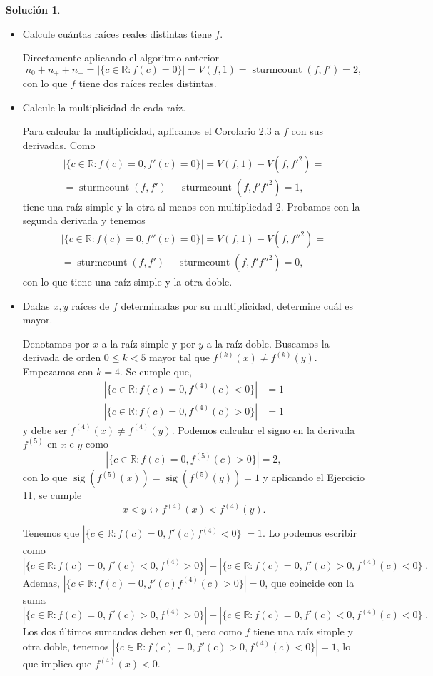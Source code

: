 \documentclass[10pt]{article}
\theoremstyle{definition}
\newtheorem*{sol}{Solución}
\newcommand{\RR}{\mathbb{R}}
\newcommand{\sig}{\operatorname{sig}}
\newcommand{\stc}{\operatorname{sturmcount}}
\begin{document}
\begin{sol}\leavevmode

\begin{itemize}
    \item Calcule cuántas raíces reales distintas tiene $f$.
    
    Directamente aplicando el algoritmo anterior
    \[n_0+n_++n_- = |\{c\in\RR : f(c)=0\}| = V(f,1)=\stc(f,f')=2,\]
    con lo que $f$ tiene dos raíces reales distintas.
    
    \item Calcule la multiplicidad de cada raíz.
    
    Para calcular la multiplicidad, aplicamos el Corolario 2.3 a $f$ con sus derivadas. Como 
    \begin{multline*}
        |\{c\in\RR: f(c)=0, f'(c)=0\}|=V(f,1)-V(f,{f'}^2)=\\=\stc(f,f')-\stc(f,f'{f'}^2)=1,
    \end{multline*}
    tiene una raíz simple y la otra al menos con multiplicdad $2$. Probamos con la segunda derivada y tenemos
    \begin{multline*}
        |\{c\in\RR: f(c)=0, f''(c)=0\}|=V(f,1)-V(f,{f''}^2)=\\=\stc(f,f')-\stc(f,f'{f''}^2)=0,    \end{multline*}
    con lo que tiene una raíz simple y la otra doble.
    
    \item Dadas $x,y$ raíces de $f$ determinadas por su multiplicidad, determine cuál es mayor.
    
    Denotamos por $x$ a la raíz simple y por $y$ a la raíz doble. Buscamos la derivada de orden $0\leq k< 5$ mayor tal que $f^{(k)}(x)\neq f^{(k)}(y)$. Empezamos con $k=4$. Se cumple que,
    \begin{align*}
        |\{c\in\RR: f(c)=0, f^{(4)}(c)<0\}| & =1\\
        |\{c\in\RR: f(c)=0, f^{(4)}(c)>0\}| & =1
    \end{align*}
    y debe ser $f^{(4)}(x)\neq f^{(4)}(y)$. Podemos calcular el signo en la derivada $f^{(5)}$ en $x$ e $y$ como
    \[|\{c\in\RR: f(c)=0, f^{(5)}(c)>0\}|=2,\]
    con lo que $\sig(f^{(5)}(x))=\sig(f^{(5)}(y))=1$ y aplicando el Ejercicio 11, se cumple \[x<y \leftrightarrow f^{(4)}(x)<f^{(4)}(y).\]
    
    Tenemos que $|\{c\in\RR: f(c)=0, f'(c)f^{(4)}<0\}|=1$. Lo podemos escribir como
    \[|\{c\in\RR: f(c)=0,f'(c)<0,f^{(4)}>0\}|+|\{c\in\RR: f(c)=0,f'(c)>0,f^{(4)}(c)<0\}|.\]
    Ademas, $|\{c\in\RR: f(c)=0,f'(c)f^{(4)}(c)>0\}|=0$, que coincide con la suma \[|\{c\in\RR: f(c)=0,f'(c)>0,f^{(4)}>0\}|+|\{c\in\RR:f(c)=0,f'(c)<0,f^{(4)}(c)<0\}|.\]
    Los dos últimos sumandos deben ser $0$, pero como $f$ tiene una raíz simple y otra doble, tenemos $|\{c\in\RR: f(c)=0,f'(c)>0,f^{(4)}(c)<0\}|=1$, lo que implica que $f^{(4)}(x)<0$.
    

\end{itemize}
\end{sol}
\end{document}
